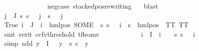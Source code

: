 \begin{isabellebody}
\ \ \ \ \ \ \ \ \ \ \ \ \isamarkupfalse%
\ neg{\isacharunderscore}{\kern0pt}case\ stacked{\isacharunderscore}{\kern0pt}pos{\isacharunderscore}{\kern0pt}rewriting\ {\isachardoublequoteopen}{}{\isachardoublequoteclose}\ \isamarkupfalse%
\ blast\isanewline
\ \ \ \ \ \ \ \ \ \ \isamarkupfalse%
\ {\isachardoublequoteopen}{\isasymforall}j\ {\isasymin}\ J{\isachardot}{\kern0pt}\ {\isacharparenleft}{\kern0pt}{\isasymforall}s{\isachardot}{\kern0pt}\ {\isacharparenleft}{\kern0pt}s\ {\isasymTurnstile}\ {\isasymPhi}\ j{\isacharparenright}{\kern0pt}\ {\isasymlongleftrightarrow}\ {\isacharparenleft}{\kern0pt}s\ {\isasymTurnstile}\ {\isasymPsi}\ j{\isacharparenright}{\kern0pt}{\isacharparenright}{\kern0pt}{\isachardoublequoteclose}\isanewline
\ \ \ \ \ \ \ \ \ \ \ \ \isamarkupfalse%
\ True\ {\isacartoucheopen}{\isasymforall}i\ {\isasymin}\ J{\isachardot}{\kern0pt}\ {\isasymPsi}\ i\ {\isacharequal}{\kern0pt}\ {\isacharparenleft}{\kern0pt}hml{\isacharunderscore}{\kern0pt}pos\ {\isacharparenleft}{\kern0pt}SOME\ {\isasymalpha}{\isachardot}{\kern0pt}\ {\isacharparenleft}{\kern0pt}{\isasymforall}s{\isachardot}{\kern0pt}\ {\isacharparenleft}{\kern0pt}s\ {\isasymTurnstile}\ {\isasymPhi}\ i{\isacharparenright}{\kern0pt}\ {\isasymlongleftrightarrow}\ {\isacharparenleft}{\kern0pt}s\ {\isasymTurnstile}\ {\isacharparenleft}{\kern0pt}hml{\isacharunderscore}{\kern0pt}pos\ {\isasymalpha}\ TT{\isacharparenright}{\kern0pt}{\isacharparenright}{\kern0pt}{\isacharparenright}{\kern0pt}{\isacharparenright}{\kern0pt}\ TT{\isacharparenright}{\kern0pt}{\isacartoucheclose}\isanewline
\ \ \ \ \ \ \ \ \ \ \ \ \isamarkupfalse%
\ {\isacharparenleft}{\kern0pt}smt\ {\isacharparenleft}{\kern0pt}verit{\isacharcomma}{\kern0pt}\ ccfv{\isacharunderscore}{\kern0pt}threshold{\isacharparenright}{\kern0pt}\ tfl{\isacharunderscore}{\kern0pt}some{\isacharparenright}{\kern0pt}\isanewline
\ \ \ \ \ \ \ \ \ \ \isamarkupfalse%
\ {\isachardoublequoteopen}{\isasymforall}i\ {\isasymin}\ I{\isachardot}{\kern0pt}\ {\isasymPhi}\ i\ {\isasymnoteq}\ {\isasymphi}\ {\isasymlongrightarrow}\ {\isacharparenleft}{\kern0pt}{\isasymforall}s{\isachardot}{\kern0pt}\ s\ {\isasymTurnstile}\ {\isasymPhi}\ i{\isacharparenright}{\kern0pt}{\isachardoublequoteclose}\isanewline
\ \ \ \ \ \ \ \ \ \ \ \ \isamarkupfalse%
\ {\isacharparenleft}{\kern0pt}simp\ add{\isacharcolon}{\kern0pt}\ {\isacartoucheopen}{\isasymforall}y{\isasymin}{\isasymPhi}\ {\isacharbackquote}{\kern0pt}\ I{\isachardot}{\kern0pt}\ {\isasymphi}\ {\isasymnoteq}\ y\ {\isasymlongrightarrow}\ {\isacharparenleft}{\kern0pt}{\isasymforall}s{\isachardot}{\kern0pt}\ s\ {\isasymTurnstile}\ y{\isacharparenright}{\kern0pt}{\isacartoucheclose}{\isacharparenright}{\kern0pt}\ \isanewline

\end{isabellebody}
